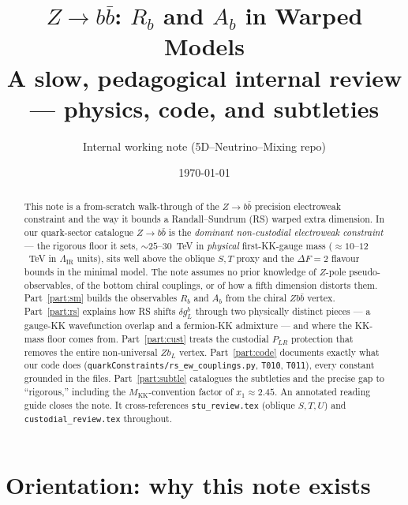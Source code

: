 \documentclass[11pt]{article}
\title{\bf $Z\to b\bar b$: $R_b$ and $A_b$ in Warped Models\\[4pt]
\large A slow, pedagogical internal review --- physics, code, and subtleties}
\author{Internal working note (5D--Neutrino--Mixing repo)}
\date{\today}
\newcommand{\MKK}{M_{\mathrm{KK}}}
\newcommand{\LIR}{\Lambda_{\mathrm{IR}}}
\newcommand{\PLR}{P_{LR}}
\newcommand{\code}[1]{\texttt{#1}}
\newcommand{\dgL}{\delta g_L^b}
\theoremstyle{definition}
\begin{document}
\maketitle

\begin{abstract}
\noindent
This note is a from-scratch walk-through of the $Z\to b\bar b$ precision
electroweak constraint and the way it bounds a Randall--Sundrum (RS) warped
extra dimension. In our quark-sector catalogue $Z\to b\bar b$ is the
\emph{dominant non-custodial electroweak constraint} --- the rigorous floor it
sets, $\sim 25$--$30$~TeV in \emph{physical} first-KK-gauge mass
($\approx 10$--$12$~TeV in $\LIR$ units), sits well above the oblique
$S,T$ proxy and the $\Delta F=2$ flavour bounds in the minimal model. The note
assumes no prior knowledge of $Z$-pole pseudo-observables, of the bottom
chiral couplings, or of how a fifth dimension distorts them. Part~\ref{part:sm}
builds the observables $R_b$ and $A_b$ from the chiral $Zb\bar b$ vertex.
Part~\ref{part:rs} explains how RS shifts $\dgL$ through two physically distinct
pieces --- a gauge-KK wavefunction overlap and a fermion-KK admixture --- and
where the KK-mass floor comes from. Part~\ref{part:cust} treats the custodial
$\PLR$ protection that removes the entire non-universal $Zb_L$ vertex.
Part~\ref{part:code} documents exactly what our code does
(\code{quarkConstraints/rs\_ew\_couplings.py}, \code{T010}, \code{T011}), every
constant grounded in the files. Part~\ref{part:subtle} catalogues the
subtleties and the precise gap to ``rigorous,'' including the
$\MKK$-convention factor of $x_1\approx 2.45$. An annotated reading guide closes
the note. It cross-references \code{stu\_review.tex} (oblique $S,T,U$) and
\code{custodial\_review.tex} throughout.
\end{abstract}

\tableofcontents

\part*{Orientation: why this note exists}
\end{document}
